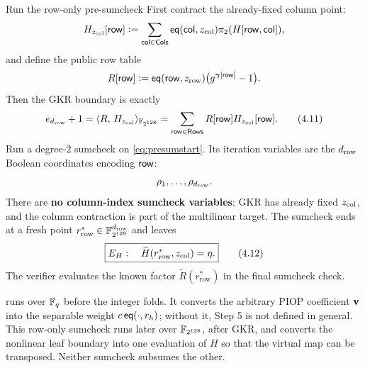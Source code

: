 \begin{step}{Run the row-only pre-sumcheck}{%
}\label{step:presum}
First contract the already-fixed column point:
\[
  H_{z_{\mathrm{col}}}[\mathsf{row}]
  \vcentcolon=
  \sum_{\mathsf{col}\in\mathsf{Cols}}
    \mathsf{eq}(\mathsf{col},z_{\mathrm{col}})\pi_2(H[\mathsf{row},\mathsf{col}]),
\]
and define the public row table
\[
  R[\mathsf{row}]
  \vcentcolon=
  \mathsf{eq}(\mathsf{row},z_{\mathrm{row}})
  \bigl(g^{\bm{\gamma}[\mathsf{row}]}-1\bigr).
\]
Then the GKR boundary is exactly
\[
  e_{d_{\mathrm{row}}}+1
  =\langle R,\, H_{z_{\mathrm{col}}}\rangle_{\mathbb{F}_{2^{128}}}
  =\sum_{\mathsf{row}\in\mathsf{Rows}}R[\mathsf{row}]H_{z_{\mathrm{col}}}[\mathsf{row}].  \tag{4.11}\label{eq:presumstart}
\]
Run a degree-$2$ sumcheck on \eqref{eq:presumstart}.  Its iteration variables are the
$d_{\mathrm{row}}$ Boolean coordinates encoding $\mathsf{row}$:
\[
  \rho_1,\ldots,\rho_{d_{\mathrm{row}}}.
\]
There are \textbf{no column-index sumcheck variables}: GKR has already fixed
$z_{\mathrm{col}}$, and the column contraction is part of the multilinear target.  The
sumcheck ends at a fresh point
$r_{\mathrm{row}}^{*}\in\mathbb{F}_{2^{128}}^{d_{\mathrm{row}}}$ and leaves
\[
  \boxed{
  E_H:\quad
  \widetilde H(r_{\mathrm{row}}^{*},z_{\mathrm{col}})=\eta.}      \tag{4.12}
\]
The verifier evaluates the known factor $\widetilde R(r_{\mathrm{row}}^{*})$
in the final sumcheck check.

\begin{remark}
\label{rem:deferredeq}
 runs over $\mathbb{F}_q$ before the integer folds.  It converts the
arbitrary PIOP coefficient $\mathbf{v}$ into the separable weight
$c\,\mathsf{eq}(\cdot,r_h)$; without it, Step 5 is not defined in general.  This
row-only sumcheck runs later over $\mathbb{F}_{2^{128}}$, after GKR, and converts the
nonlinear leaf boundary into one evaluation of $H$ so that the virtual map can
be transposed.  Neither sumcheck subsumes the other.
\end{remark}

\end{step}

